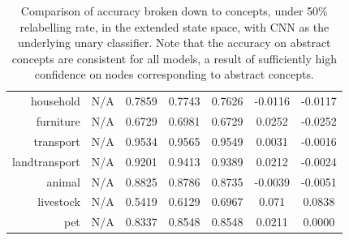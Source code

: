 \documentclass[11pt,a4paper]{article}
\begin{document}
\begin{table}[htbp]
\begin{tabular}{r|c|c|c|c|c|c}
household     & N/A    & 0.7859 & 0.7743 & 0.7626 & -0.0116 & -0.0117\\
furniture     & N/A    & 0.6729 & 0.6981 & 0.6729 & 0.0252 & -0.0252\\
transport     & N/A    & 0.9534 & 0.9565 & 0.9549 & 0.0031 & -0.0016\\
landtransport & N/A    & 0.9201 & 0.9413 & 0.9389 & 0.0212 & -0.0024\\
animal        & N/A    & 0.8825 & 0.8786 & 0.8735 & -0.0039 & -0.0051\\
livestock     & N/A    & 0.5419 & 0.6129 & 0.6967 & 0.071 & 0.0838\\
pet           & N/A    & 0.8337 & 0.8548 & 0.8548 & 0.0211 & 0.0000
\end{tabular}
\caption{Comparison of accuracy broken down to concepts, under 50\% relabelling rate, in the extended state space, with CNN as the underlying unary classifier. Note that the accuracy on abstract concepts are consistent for all models, a result of sufficiently high confidence on nodes corresponding to abstract concepts.}
\label{tab:cnn50acc}
\end{table}
\end{document}

